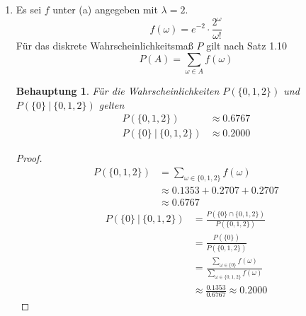 \documentclass[a4paper]{scrartcl}
\newtheorem*{behaupt}{Behauptung}
\begin{document}
\begin{enumerate}[label=\bfseries\arabic*.]
\begin{enumerate}[label=(\alph*)]
            \item
                Es sei $f$ unter (a) angegeben mit $\lambda = 2$.
                \begin{equation*}
                    f(\omega) = e^{-2} \cdot \frac{2^\omega}{\omega!}
                \end{equation*}
                Für das diskrete Wahrscheinlichkeitsmaß $P$ gilt nach Satz 1.10
                \begin{equation*}
                    P(A) = \sum_{\omega \in A} f(\omega)
                \end{equation*}
                \begin{behaupt}
                    Für die Wahrscheinlichkeiten $P(\{0, 1, 2\})$ und
                    $P(\{0\}\ |\ \{0, 1, 2\})$ gelten
                    \begin{align*}
                        P(\{0, 1, 2\}) &\approx \num{0,6767} \\
                        P(\{0\}\ |\ \{0, 1, 2\}) &\approx \num{0,2000}
                    \end{align*}
                \end{behaupt}
                \begin{proof}
                    \begin{equation*}
                        \begin{split}
                            P(\{0, 1, 2\}) &=
                            \sum_{\omega \in \{0, 1, 2\}} f(\omega) \\
                            &\approx \num{0,1353} + \num{0,2707} + \num{0.2707}
                            \\
                            &\approx \num{0,6767}
                        \end{split}
                    \end{equation*}
                    \begin{equation*}
                        \begin{split}
                            P(\{0\}\ |\ \{0, 1, 2\})
                            &= \frac{P(\{0\} \cap \{0, 1, 2\})}{P(\{0, 1, 2\})}
                            \\
                            &= \frac{P(\{0\})}{P(\{0, 1, 2\})} \\
                            &= \frac{\sum\limits_{\omega \in \{0\}} f(\omega)}
                                {\sum\limits_{\omega \in \{0, 1, 2\}} f(\omega)}
                                \\
                            &\approx \frac{\num{0.1353}}{\num{0.6767}}
                            \approx \num{0,2000}
                        \end{split}
                    \end{equation*}
                \end{proof}

        \end{enumerate}

\end{enumerate}
\end{document}
